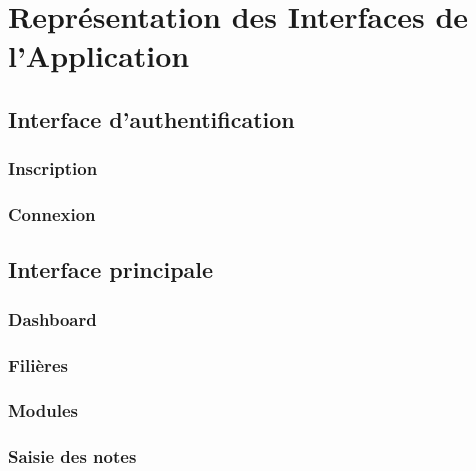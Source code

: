 \chapter{Représentation des Interfaces de l'Application}
\section{Interface d'authentification}
\subsection{Inscription}
\subsection{Connexion}
\section{Interface principale}
\subsection{Dashboard}
\subsection{Filières}
\subsection{Modules}
\subsection{Saisie des notes}

